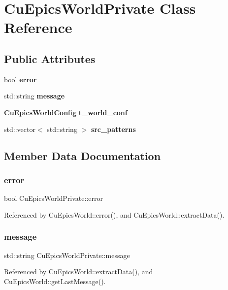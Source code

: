 \section{Cu\+Epics\+World\+Private Class Reference}
\label{classCuEpicsWorldPrivate}
\subsection*{Public Attributes}
\begin{DoxyCompactItemize}
\item 
bool \textbf{ error}
\item 
std\+::string \textbf{ message}
\item 
\textbf{ Cu\+Epics\+World\+Config} \textbf{ t\+\_\+world\+\_\+conf}
\item 
std\+::vector$<$ std\+::string $>$ \textbf{ src\+\_\+patterns}
\end{DoxyCompactItemize}


\subsection{Member Data Documentation}
\mbox{\label{classCuEpicsWorldPrivate_a5feb953c60fdc236448247ff06f668a9}} 
\subsubsection{error}
{\footnotesize\ttfamily bool Cu\+Epics\+World\+Private\+::error}



Referenced by Cu\+Epics\+World\+::error(), and Cu\+Epics\+World\+::extract\+Data().

\mbox{\label{classCuEpicsWorldPrivate_a8c69f47e5e29d6c4234d741b1cf731ea}} 
\subsubsection{message}
{\footnotesize\ttfamily std\+::string Cu\+Epics\+World\+Private\+::message}



Referenced by Cu\+Epics\+World\+::extract\+Data(), and Cu\+Epics\+World\+::get\+Last\+Message().

